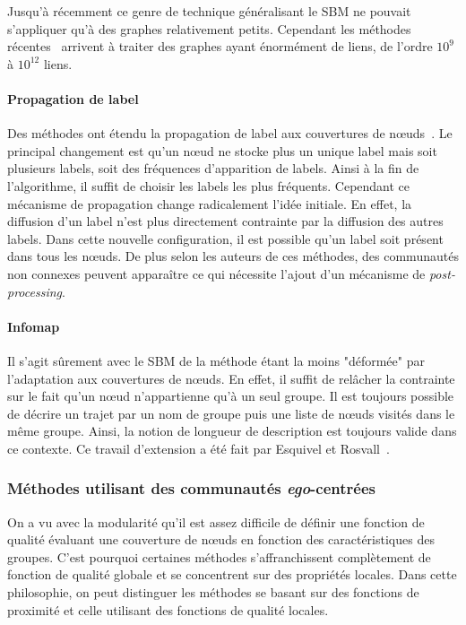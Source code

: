 Jusqu'à récemment ce genre de technique généralisant le SBM ne pouvait s'appliquer qu'à des graphes relativement petits.
Cependant les méthodes récentes~\cite{Gopalan2013a, Yang2013} arrivent à traiter des graphes ayant énormément de liens, de l'ordre $10^{9}$ à $10^{12}$ liens.



\paragraph{Propagation de label}
Des méthodes ont étendu la propagation de label aux couvertures de n\oe{}uds~\cite{Gregory2010,Xie2011}.
Le principal changement est qu'un n\oe{}ud ne stocke plus un unique label mais soit plusieurs labels, soit des fréquences d'apparition de labels.
Ainsi à la fin de l'algorithme, il suffit de choisir les labels les plus fréquents.
Cependant ce mécanisme de propagation change radicalement l'idée initiale.
En effet, la diffusion d'un label n'est plus directement contrainte par la diffusion des autres labels.
Dans cette nouvelle configuration, il est possible qu'un label soit présent dans tous les n\oe{}uds.
De plus selon les auteurs de ces méthodes, des communautés non connexes peuvent apparaître ce qui nécessite l’ajout d’un mécanisme de \emph{post-processing}.


\paragraph{Infomap}
Il s'agit sûrement avec le SBM de la méthode étant la moins "déformée" par l'adaptation aux couvertures de n\oe{}uds.
En effet, il suffit de relâcher la contrainte sur le fait qu'un n\oe{}ud n'appartienne qu'à un seul groupe.
Il est toujours possible de décrire un trajet par un nom de groupe puis une liste de n\oe{}uds visités dans le même groupe.
Ainsi, la notion de longueur de description est toujours valide dans ce contexte.
Ce travail d'extension a été fait par Esquivel et Rosvall~\cite{Esquivel2011}.

\subsubsection{Méthodes utilisant des communautés \emph{ego}-centrées}
On a vu avec la modularité qu'il est assez difficile de définir une fonction de qualité évaluant une couverture de n\oe{}uds en fonction des caractéristiques des groupes.
C'est pourquoi certaines méthodes s'affranchissent complètement de fonction de qualité globale et se concentrent sur des propriétés locales.
Dans cette philosophie, on peut distinguer les méthodes se basant sur des fonctions de proximité et celle utilisant des fonctions de qualité locales.

